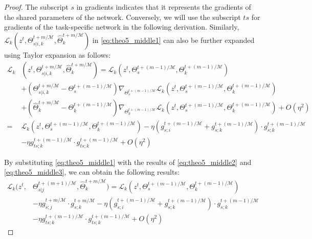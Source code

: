 \begin{proof}
The subscript $s$ in gradients indicates that it represents the gradients of the shared parameters of the network. Conversely, we will use the subscript $ts$ for gradients of the task-specific network in the following derivation. Similarly, $\mathcal{L}_k (z^t, \Theta_{s|i,k}^{t+m/\mathcal{M}}, \hat{\Theta}_k^{t+m/\mathcal{M}})$ in \cref{eq:theo5_middle1} can also be further expanded using Taylor expansion as follows:
\begin{align}
    \mathcal{L}_k &(z^t, \Theta_{s|i,k}^{t+m/\mathcal{M}}, \hat{\Theta}_k^{t+m/\mathcal{M}}) = \mathcal{L}_k (z^t, \Theta_s^{t+(m-1)/\mathcal{M}}, \Theta_k^{t+(m-1)/\mathcal{M}}) \\
    &+(\Theta_{s|i,k}^{t+m/\mathcal{M}} - \Theta_s^{t+(m-1)/\mathcal{M}}) \nabla_{\Theta_s^{t+(m-1)/\mathcal{M}}} \mathcal{L}_k (z^t, \Theta_s^{t+(m-1)/\mathcal{M}}, \Theta_k^{t+(m-1)/\mathcal{M}})\\
    &+(\hat{\Theta}_k^{t+m/\mathcal{M}}-\Theta_k^{t+(m-1)/\mathcal{M}}) \nabla_{\Theta_k^{t+(m-1)/\mathcal{M}}} \mathcal{L}_k (z^t, \Theta_s^{t+(m-1)/\mathcal{M}}, \Theta_k^{t+(m-1)/\mathcal{M}}) + O(\eta^2)\\
    =& \mathcal{L}_k (z^t, \Theta_s^{t+(m-1)/\mathcal{M}}, \Theta_k^{t+(m-1)/\mathcal{M}}) - \eta (g_{s;i}^{t+(m-1)/\mathcal{M}} + g_{s;k}^{t+(m-1)/\mathcal{M}})\cdot g_{s;k}^{t+(m-1)/\mathcal{M}} \label{eq:theo5_middle2}\\
    &- \eta g_{ts;k}^{t+(m-1)/\mathcal{M}}\cdot g_{ts;k}^{t+(m-1)/\mathcal{M}} + O(\eta^2) \label{eq:theo5_middle3}
\end{align}

By substituting \cref{eq:theo5_middle1} with the results of \cref{eq:theo5_middle2} and \cref{eq:theo5_middle3}, we can obtain the following results:
\begin{align}
    \mathcal{L}_k(z^t, &\Theta_{s|j}^{t+(m+1)/\mathcal{M}}, \hat{\Theta}_k^{t+m/\mathcal{M}}) = \mathcal{L}_k (z^t, \Theta_s^{t+(m-1)/\mathcal{M}}, \Theta_k^{t+(m-1)/\mathcal{M}})\\
    &- \eta g_{s;j}^{t+m/\mathcal{M}}\cdot g_{s;k}^{t+m/\mathcal{M}} - \eta (g_{s;i}^{t+(m-1)/\mathcal{M}} + g_{s;k}^{t+(m-1)/\mathcal{M}})\cdot g_{s;k}^{t+(m-1)/\mathcal{M}} \\
    &- \eta g_{ts;k}^{t+(m-1)/\mathcal{M}}\cdot g_{ts;k}^{t+(m-1)/\mathcal{M}}+ O(\eta^2)
\end{align}


\end{proof}
